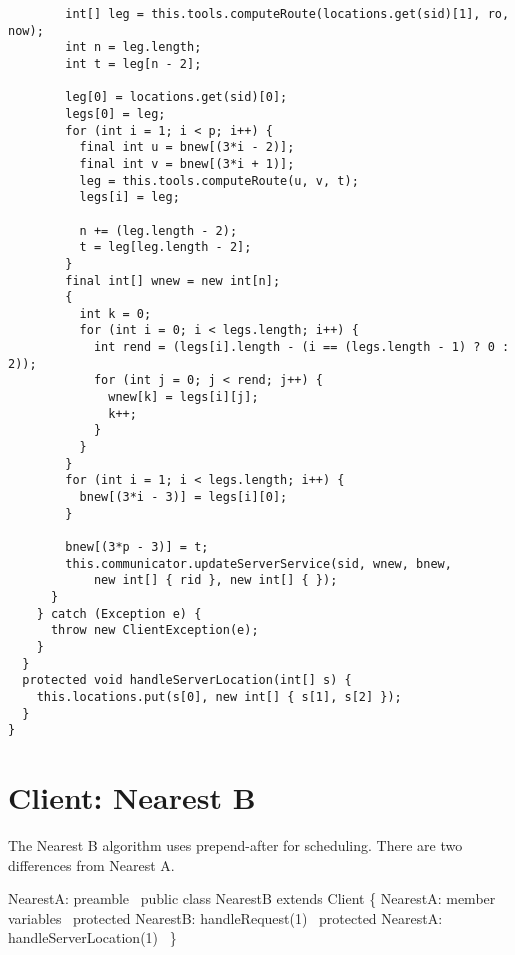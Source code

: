 {\begin{verbatim}
        int[] leg = this.tools.computeRoute(locations.get(sid)[1], ro, now);
        int n = leg.length;
        int t = leg[n - 2];

        leg[0] = locations.get(sid)[0];
        legs[0] = leg;
        for (int i = 1; i < p; i++) {
          final int u = bnew[(3*i - 2)];
          final int v = bnew[(3*i + 1)];
          leg = this.tools.computeRoute(u, v, t);
          legs[i] = leg;

          n += (leg.length - 2);
          t = leg[leg.length - 2];
        }
        final int[] wnew = new int[n];
        {
          int k = 0;
          for (int i = 0; i < legs.length; i++) {
            int rend = (legs[i].length - (i == (legs.length - 1) ? 0 : 2));
            for (int j = 0; j < rend; j++) {
              wnew[k] = legs[i][j];
              k++;
            }
          }
        }
        for (int i = 1; i < legs.length; i++) {
          bnew[(3*i - 3)] = legs[i][0];
        }

        bnew[(3*p - 3)] = t;
        this.communicator.updateServerService(sid, wnew, bnew,
            new int[] { rid }, new int[] { });
      }
    } catch (Exception e) {
      throw new ClientException(e);
    }
  }
  protected void handleServerLocation(int[] s) {
    this.locations.put(s[0], new int[] { s[1], s[2] });
  }
}
\end{verbatim}
}

\nwenddocs{}\chapter{Client: Nearest B}
\label{client-nearest-b}

The Nearest B algorithm uses prepend-after for scheduling. There are two
differences from Nearest A.

\nwenddocs{}\endmoddef\nwstartdeflinemarkup\nwenddeflinemarkup
\LA{}NearestA: preamble~{\nwtagstyle{}}\RA{}
public class NearestB extends Client \{
  \LA{}NearestA: member variables~{\nwtagstyle{}}\RA{}
  protected \LA{}NearestB: handleRequest(1)~{\nwtagstyle{}}\RA{}
  protected \LA{}NearestA: handleServerLocation(1)~{\nwtagstyle{}}\RA{}
\}
\nwendcode{}\nwdocspar

